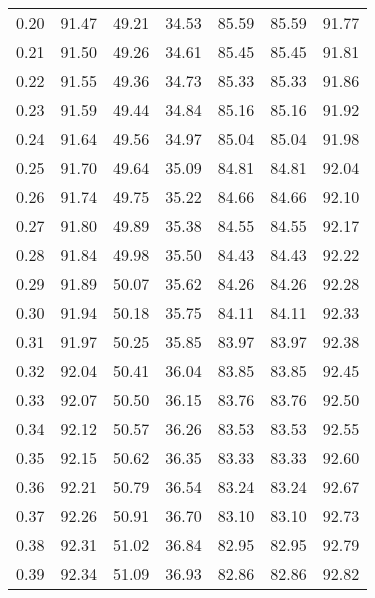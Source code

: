 \begin{tabular}{|c|c|c|c|c|c|c|}
      0.20 &     91.47 &     49.21 &      34.53 &   85.59 &      85.59 &         91.77 \\
      0.21 &     91.50 &     49.26 &      34.61 &   85.45 &      85.45 &         91.81 \\
      0.22 &     91.55 &     49.36 &      34.73 &   85.33 &      85.33 &         91.86 \\
      0.23 &     91.59 &     49.44 &      34.84 &   85.16 &      85.16 &         91.92 \\
      0.24 &     91.64 &     49.56 &      34.97 &   85.04 &      85.04 &         91.98 \\
      0.25 &     91.70 &     49.64 &      35.09 &   84.81 &      84.81 &         92.04 \\
      0.26 &     91.74 &     49.75 &      35.22 &   84.66 &      84.66 &         92.10 \\
      0.27 &     91.80 &     49.89 &      35.38 &   84.55 &      84.55 &         92.17 \\
      0.28 &     91.84 &     49.98 &      35.50 &   84.43 &      84.43 &         92.22 \\
      0.29 &     91.89 &     50.07 &      35.62 &   84.26 &      84.26 &         92.28 \\
      0.30 &     91.94 &     50.18 &      35.75 &   84.11 &      84.11 &         92.33 \\
      0.31 &     91.97 &     50.25 &      35.85 &   83.97 &      83.97 &         92.38 \\
      0.32 &     92.04 &     50.41 &      36.04 &   83.85 &      83.85 &         92.45 \\
      0.33 &     92.07 &     50.50 &      36.15 &   83.76 &      83.76 &         92.50 \\
      0.34 &     92.12 &     50.57 &      36.26 &   83.53 &      83.53 &         92.55 \\
      0.35 &     92.15 &     50.62 &      36.35 &   83.33 &      83.33 &         92.60 \\
      0.36 &     92.21 &     50.79 &      36.54 &   83.24 &      83.24 &         92.67 \\
      0.37 &     92.26 &     50.91 &      36.70 &   83.10 &      83.10 &         92.73 \\
      0.38 &     92.31 &     51.02 &      36.84 &   82.95 &      82.95 &         92.79 \\
      0.39 &     92.34 &     51.09 &      36.93 &   82.86 &      82.86 &         92.82 \\

\end{tabular}
